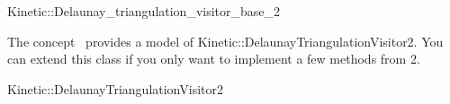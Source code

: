 

\begin{ccRefClass}{Kinetic::Delaunay_triangulation_visitor_base_2}


\ccDefinition
  
The concept \ccRefName\ provides a model of
Kinetic::DelaunayTriangulationVisitor2. You can extend this class if you only
want to implement a few methods from 2.

\ccIsModel

Kinetic::DelaunayTriangulationVisitor2

\ccCreation
{}  %


\ccSeeAlso



\end{ccRefClass}


